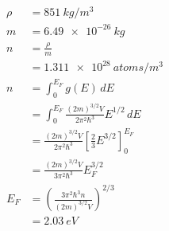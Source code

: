 \documentclass{article}
\begin{document}
\begin{align*}
  \rho & = \qty{851}{kg/m^3}                                                                    \\
  m    & = \qty{6.49e-26}{kg}                                                                   \\
  n    & = \frac{\rho}{m}                                                                       \\
       & = \qty{1.311e28}{atoms/m^3}                                                            \\
  n    & = \int_0^{E_F} g(E) \,d E                                                              \\
       & = \int_0^{E_F} \frac{(2 m)^{3 / 2} V}{2 \pi^2 \hbar^3} E^{1 / 2} \,d E                 \\
       & = \frac{(2 m)^{3 / 2} V}{2 \pi^2 \hbar^3} \left[ \frac{2}{3} E^{3 / 2} \right]_0^{E_F} \\
       & = \frac{(2 m)^{3 / 2} V}{3 \pi^2 \hbar^3} E_F^{3 / 2}                                  \\
  E_F  & = \left( \frac{3 \pi^2 \hbar^3 n}{(2 m)^{3 / 2} V} \right)^{2 / 3}                     \\
       & = \qty{2.03}{eV}
\end{align*}

\setcounter{subsubsection}{48}
\subsubsection{}
\end{document}
